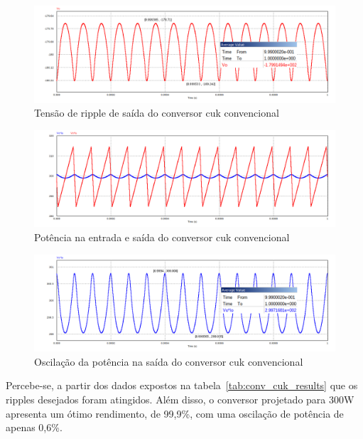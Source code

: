 \documentclass[
	12pt,				%
	openany,
	onseside,
	a4paper,			%
	english,			%
	french,				%
	spanish,			%
	brazil,				%
	]{abntex2}
\begin{document}
\begin{figure}[H]%
	\centering
		\includegraphics[width= \linewidth]{cuk_conv_ripp_V_out2}
		\caption{Tensão de ripple de saída do conversor cuk convencional}
		\label{fig:cuk_conv_ripp_V_out_}
\end{figure}

\begin{figure}[H]%
	\centering
		\includegraphics[width= \linewidth]{cuk_conv_power_sign}
		\caption{Potência na entrada e saída do conversor cuk convencional}
		\label{fig:cuk_conv_power_sign}
\end{figure}
\vspace{-5pt}
\begin{figure}[H]%
	\centering
		\includegraphics[width= \linewidth]{cuk_conv_power_sign_out}
		\caption{Oscilação da potência na saída do conversor cuk convencional}
		\label{fig:cuk_conv_power_sign_out}
\end{figure}
\vspace{-5pt}

Percebe-se, a partir dos dados expostos na tabela~\ref{tab:conv_cuk_results} que os ripples desejados foram atingidos. Além disso, o conversor projetado para 300W apresenta um ótimo rendimento, de 99,9\%, com uma oscilação de potência de apenas 0,6\%.
\end{document}
